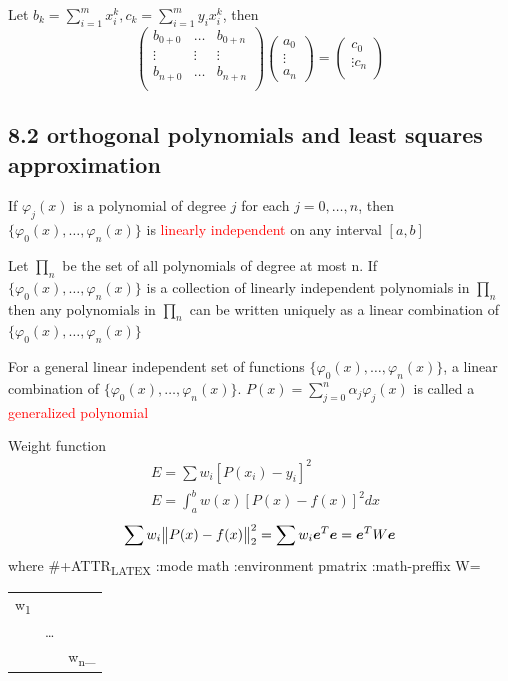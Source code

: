 \documentclass[11pt]{article}
\begin{document}
Let \(b_k=\displaystyle\sum_{i=1}^m x_i^k,
   c_k=\displaystyle\sum_{i=1}^my_ix_i^k\), then
\begin{equation*}
\begin{pmatrix}
b_{0+0} & \dots & b_{0+n}\\
\vdots & \vdots&\vdots\\
b_{n+0} & \dots & b_{n+n}\\
\end{pmatrix}
\begin{pmatrix}
a_0\\
\vdots\\
a_n
\end{pmatrix}=
\begin{pmatrix}
c_0\\
\vdots
c_n\\
\end{pmatrix}
\end{equation*}
\subsection{8.2 orthogonal polynomials and least squares approximation}
\label{sec:org774f82b}
\begin{theorem}
If $\varphi_j(x)$ is a polynomial of degree $j$ for each $j=0,\dots,n$, then 
$\{\varphi_0(x),\dots,\varphi_n(x)\}$ is \textcolor{red}{linearly independent} on
any interval $[a,b]$
\end{theorem}

\begin{theorem}
Let $\prod_n$ be the set of all polynomials of degree at most n. If
$\{\varphi_0(x),\dots,\varphi_n(x)\}$ is a collection of linearly independent
polynomials in $\prod_n$ then any polynomials in $\prod_n$ can be written
uniquely as a linear combination of $\{\varphi_0(x),\dots,\varphi_n(x)\}$
\end{theorem}

\begin{definition}
For a general linear independent set of functions $\{\varphi_0(x),\dots,\varphi_n(x)\}$,
a linear combination of $\{\varphi_0(x),\dots,\varphi_n(x)\}$.
$P(x)=\displaystyle\sum_{j=0}^n\alpha_j\varphi_j(x)$ is called a
\textcolor{red}{generalized polynomial} 
\end{definition}


Weight function
\begin{align*}
&E=\sum w_i[P(x_i)-y_i]^2\\
&E=\int_a^bw(x)[P(x)-f(x)]^2dx
\end{align*}
\begin{equation*}
\sum w_i\norm{P(x)-f(x)}_2^2=\sum w_i\boldsymbol{e}^T\boldsymbol{e}=\boldsymbol{e}^TW\boldsymbol{e}
\end{equation*}
where
\#+ATTR\textsubscript{LATEX} :mode math :environment pmatrix :math-preffix W=
\begin{center}
\begin{tabular}{lll}
w\textsubscript{1} &  & \\
 & \dots{} & \\
 &  & w\textsubscript{n}\_\\
\end{tabular}
\end{center}
\end{document}
